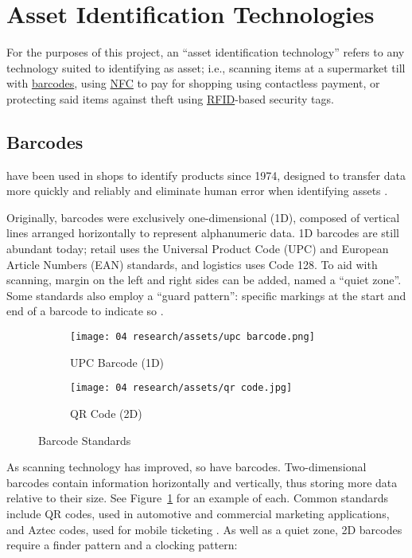 \section{Asset Identification Technologies}

For the purposes of this project, an \enquote{asset
  identification technology} refers to any technology suited
to identifying as asset; i.e., scanning items at a
supermarket till with \hyperref[ss:barcodes]{barcodes},
using \hyperref[ss:nfc]{NFC} to pay for shopping using
contactless payment, or protecting said items against theft
using \hyperref[ss:rfid]{RFID}-based security tags.

\subsection{Barcodes} \label{ss:barcodes}

 have been used in shops to
identify products
since 1974, designed to transfer data more quickly and
reliably and eliminate human error when identifying assets
\parencite{whatIsABarcode}.

Originally, barcodes were exclusively one-dimensional (1D),
composed of vertical lines arranged horizontally to
represent alphanumeric data.
1D barcodes are still abundant today; retail uses
the Universal Product Code (UPC) and European Article
Numbers (EAN) standards, and logistics uses Code 128.
To aid with scanning, margin on the left and right sides
can be added, named a \enquote{quiet zone}.
Some standards also employ a \enquote{guard pattern}:
specific markings at the start and end of a barcode to
indicate so \parencite{whatIsABarcode}.

\begin{figure}[h]
  \centering
  \begin{subfigure}{\subfigwidth}
    \centering
    \texttt{[image: 04
      research/assets/upc barcode.png]}
    \caption{UPC Barcode (1D)}
    \parencite{img:upcBarcode}
  \end{subfigure}
  \begin{subfigure}{\subfigwidth}
    \centering
    \texttt{[image: 04
      research/assets/qr code.jpg]}
    \caption{QR Code (2D)}
    \parencite{img:qrCode}
  \end{subfigure}

  \caption{Barcode Standards}
  \label{fig:barcodes}
\end{figure}

As scanning technology has improved, so have barcodes.
Two-dimensional barcodes contain information horizontally
and vertically, thus storing more data relative to their
size.
See Figure~\ref{fig:barcodes} for an example of each.
Common standards include QR codes, used in automotive and
commercial marketing applications, and Aztec codes, used
for mobile ticketing \parencite{whatIsABarcode}.
As well as a quiet zone, 2D barcodes require a finder
pattern and a clocking pattern: 

